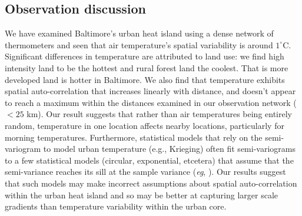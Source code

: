 \documentclass[draft,linenumbers]{agujournal}
\begin{document}
%

\subsection{Observation discussion}
We have examined Baltimore's urban heat island using a dense network of thermometers and seen that air temperature's spatial variability is around $1^\circ$C. Significant differences in temperature are attributed to land use: we find high intensity land to be the hottest and rural forest land the coolest. That is more developed land is hotter in Baltimore. We also find that temperature exhibits spatial auto-correlation that increases linearly with distance, and doesn't appear to reach a maximum within the distances examined in our observation network ($<25$ km). 
 Our result suggests that rather than air temperatures being entirely random, temperature in one location affects nearby locations, particularly for morning temperatures. Furthermore, statistical models that rely on the semi-variogram to model urban temperature (e.g., Krieging) often fit semi-variograms to a few statistical models (circular, exponential, etcetera) that assume that the semi-variance reaches its sill at the sample variance (\textit{eg}, \cite{hardin2017urban}). 
 Our results suggest that such models may make incorrect assumptions about spatial auto-correlation within the urban heat island and so may be better at capturing larger scale gradients than temperature variability within the urban core.
 
\end{document}
